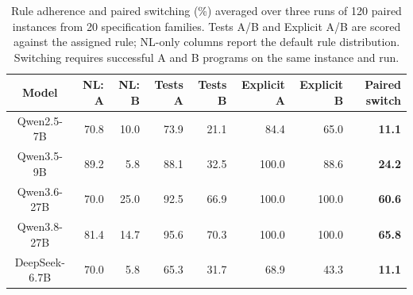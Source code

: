 \begin{table}[!htbp]
\centering
\caption{Rule adherence and paired switching (\%) averaged over three runs of 120 paired instances from 20 specification families. Tests A/B and Explicit A/B are scored against the assigned rule; NL-only columns report the default rule distribution. Switching requires successful A and B programs on the same instance and run.}
\label{tab:semantic}
\small
\begin{tabular}{crrrrrrr}
\toprule
Model & NL: A & NL: B & Tests A & Tests B & Explicit A & Explicit B & \textbf{Paired switch} \\
\midrule
Qwen2.5-7B & 70.8 & 10.0 & 73.9 & 21.1 & 84.4 & 65.0 & \textbf{11.1} \\
Qwen3.5-9B & 89.2 & 5.8 & 88.1 & 32.5 & 100.0 & 88.6 & \textbf{24.2} \\
Qwen3.6-27B & 70.0 & 25.0 & 92.5 & 66.9 & 100.0 & 100.0 & \textbf{60.6} \\
Qwen3.8-27B & 81.4 & 14.7 & 95.6 & 70.3 & 100.0 & 100.0 & \textbf{65.8} \\
DeepSeek-6.7B & 70.0 & 5.8 & 65.3 & 31.7 & 68.9 & 43.3 & \textbf{11.1} \\
\bottomrule
\end{tabular}
\end{table}
